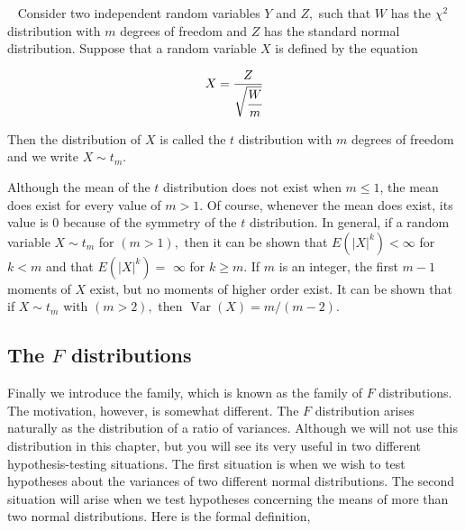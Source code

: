 \documentclass[ 11pt,%
				a4paper,%
				twoside,%
				headinclude,%
				footinclude = true,%
				cleardoublepage = empty,%
				reqno]{scrbook}
\begin{document}
\begin{definition}[$t$ distributions]~\label{defn:tdist}
  Consider two independent random variables $Y$ and $Z,$ such that $W$ has the $\chi^{2}$ distribution with $m$ degrees of freedom and $Z$ has the standard normal distribution. Suppose that a random variable $X$ is defined by the equation

  \begin{align}
    X=\frac{Z}{\sqrt{\cfrac{W}{m}}}
  \end{align}

Then the distribution of $X$ is called the $t$ distribution with $m$ degrees of freedom and we write $X \sim t_m$.
\end{definition}

\begin{remark}

Although the mean of the $t$ distribution does not exist when $m\leq 1$, the mean does exist for every value of $m > 1$. Of course, whenever the mean does exist, its value is $0$ because of the symmetry of the $t$ distribution. In general, if a random variable $X \sim t_m$ for $(m>1),$ then it can be shown that $E\left(|X|^{k}\right)<\infty$ for $k<m$ and that $E\left(|X|^{k}\right)=$ $\infty$ for $k \geq m .$ If $m$ is an integer, the first $m-1$ moments of $X$ exist, but no moments of higher order exist. It can be shown that if $X \sim t_m$ with $(m>2),$ then $\operatorname{Var}(X)=m /(m-2)$.
  
\end{remark}
 

\subsection{The $F$ distributions}


Finally we introduce the family, which is known as the family of $F$ distributions. The motivation, however, is somewhat different. The $F$ distribution arises naturally as the distribution of a ratio of variances. Although we will not use this distribution in this chapter, but you will see its very useful in two different hypothesis-testing situations. The first situation is when we wish to test hypotheses about the variances of two different normal distributions. The second situation will arise when we test hypotheses concerning the means of more than two normal distributions. Here is the formal definition,
\end{document}
